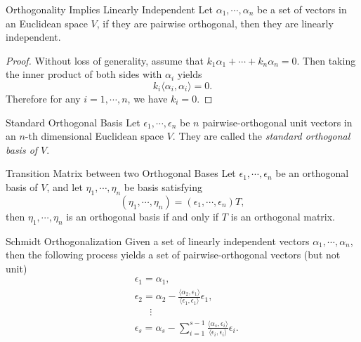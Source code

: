 \begin{proposition}{Orthogonality Implies Linearly Independent}{}
  Let $\alpha_1,\cdots,\alpha_n$ be a set of vectors in an Euclidean space $V$,
  if they are pairwise orthogonal, then they are linearly independent.
\end{proposition}

\begin{proof}
  Without loss of generality,
  assume that $k_1 \alpha_1 + \cdots + k_n\alpha_n = 0$.
  Then taking the inner product of both sides with $\alpha_i$ yields
  \begin{equation}
    k_i \langle \alpha_i, \alpha_i \rangle = 0.
  \end{equation}
  Therefore for any $i = 1,\cdots,n$, we have $k_i = 0$.
\end{proof}

\begin{definition}{Standard Orthogonal Basis}{}
  Let $\epsilon_1,\cdots,\epsilon_n$ be $n$ pairwise-orthogonal unit vectors
  in an $n$-th dimensional Euclidean space $V$.
  They are called the \emph{standard orthogonal basis of $V$}.
\end{definition}

\begin{proposition}{Transition Matrix between two Orthogonal Bases}{}
  Let $\epsilon_1,\cdots,\epsilon_n$ be an orthogonal basis of $V$,
  and let $\eta_1,\cdots,\eta_n$ be basis satisfying
  \begin{equation}
    (\eta_1,\cdots,\eta_n) = (\epsilon_1,\cdots,\epsilon_n)T,
  \end{equation}
  then $\eta_1,\cdots,\eta_n$ is an orthogonal basis if and only if $T$ is an
  orthogonal matrix.
\end{proposition}

\begin{theorem}{Schmidt Orthogonalization}{}
  Given a set of linearly independent vectors $\alpha_1,\cdots,\alpha_n$,
  then the following process yields a set of pairwise-orthogonal vectors (but
  not unit)
  \begin{align*}
    &\epsilon_1 = \alpha_1,\\
    &\epsilon_2 = \alpha_2 - \frac{\langle \alpha_2, \epsilon_1 \rangle}{\langle \epsilon_1, \epsilon_1\rangle} \epsilon_1,\\
    &~~~~~~~\vdots\\
    &\epsilon_s = \alpha_s - \sum\limits_{i = 1}^{s - 1} \frac{\langle \alpha_s, \epsilon_i \rangle}{\langle\epsilon_i, \epsilon_i \rangle}\epsilon_i.
  \end{align*}
\end{theorem}

